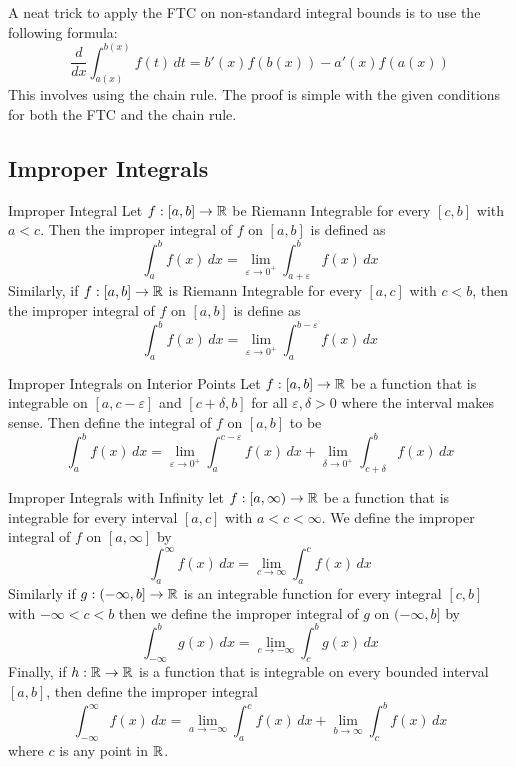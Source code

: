 \documentclass[a4paper]{article}
\begin{document}
A neat trick to apply the FTC on non-standard integral bounds is to use the following formula: $$\frac{d}{dx}\int_{a(x)}^{b(x)}f(t)\,dt=b'(x)f(b(x))-a'(x)f(a(x))$$ This involves using the chain rule. The proof is simple with the given conditions for both the FTC and the chain rule. 

\subsection{Improper Integrals}
\begin{defn}{Improper Integral}{} Let $f:[a,b]\to\mathbb{R}$ be Riemann Integrable for every $[c,b]$ with $a<c$. Then the improper integral of $f$ on $[a,b]$ is defined as $$\int_a^bf(x)\,dx=\lim_{\varepsilon\to0^+}\int_{a+\varepsilon}^bf(x)\,dx $$
Similarly, if $f:[a,b]\to\mathbb{R}$ is Riemann Integrable for every $[a,c]$ with $c<b$, then the improper integral of $f$ on $[a,b]$ is define as $$\int_a^bf(x)\,dx=\lim_{\varepsilon\to0^+}\int_a^{b-\varepsilon}f(x)\,dx$$
\end{defn}

\begin{defn}{Improper Integrals on Interior Points}{} Let $f:[a,b]\to\mathbb{R}$ be a function that is integrable on $[a,c-\varepsilon]$ and $[c+\delta,b]$ for all $\varepsilon,\delta>0$ where the interval makes sense. Then define the integral of $f$ on $[a,b]$ to be $$\int_a^bf(x)\,dx=\lim_{\varepsilon\to0^+}\int_a^{c-\varepsilon}f(x)\,dx+\lim_{\delta\to0^+}\int_{c+\delta}^bf(x)\,dx$$
\end{defn}

\begin{defn}{Improper Integrals with Infinity}{} let $f:[a,\infty)\to\mathbb{R}$ be a function that is integrable for every interval $[a,c]$ with $a<c<\infty$. We define the improper integral of $f$ on $[a,\infty]$ by $$\int_{a}^{\infty}f(x)\,dx=\lim_{c\to\infty}\int_{a}^{c}f(x)\,dx$$
Similarly if $g:(-\infty,b]\to\mathbb{R}$ is an integrable function for every integral $[c,b]$ with $-\infty<c<b$ then we define the improper integral of $g$ on $(-\infty,b]$ by $$\int_{-\infty}^{b}g(x)\,dx=\lim_{c\to-\infty}\int_{c}^{b}g(x)\,dx$$
Finally, if $h:\mathbb{R}\to\mathbb{R}$ is a function that is integrable on every bounded interval $[a,b]$, then define the improper integral $$\int_{-\infty}^\infty f(x)\,dx=\lim_{a\to-\infty}\int_a^cf(x)\,dx+\lim_{b\to\infty}\int_c^bf(x)\,dx$$ where $c$ is any point in $\mathbb{R}$. 
\end{defn}
\end{document}
